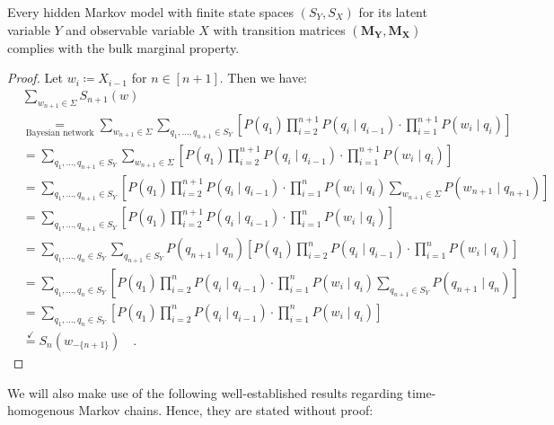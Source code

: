 \documentclass[../../main.tex]{subfiles}
\begin{document}
    \begin{lemma}
        Every hidden Markov model with finite state spaces $(S_Y, S_X)$ for its latent variable $Y$ and observable variable $X$ with transition matrices $(\bm{M_Y}, \bm{M_X})$ complies with the bulk marginal property.
    \end{lemma}
    \vspace{-2.5em}
    \begin{proof}
        Let $w_i \coloneqq X_{i - 1}$ for $n \in [n + 1]$. Then we have:
        \begin{align*}
            &\sum_{w_{n + 1} \in \Sigma} S_{n + 1}(w) \\
            &\underset{\text{Bayesian network}}{=} \sum_{w_{n + 1} \in \Sigma} \sum_{q_1, \dots, q_{n+1} \in S_Y} \left[ P(q_1) \prod_{i=2}^{n+1} P(q_i \mid q_{i-1}) \cdot \prod_{i=1}^{n+1} P(w_i \mid q_i) \right] \\
            &= \sum_{q_1, \dots, q_{n+1} \in S_Y} \sum_{w_{n + 1} \in \Sigma}  \left[ P(q_1) \prod_{i=2}^{n+1} P(q_i \mid q_{i-1}) \cdot \prod_{i=1}^{n+1} P(w_i \mid q_i) \right] \\
            &= \sum_{q_1, \dots, q_{n+1} \in S_Y} \left[ P(q_1) \prod_{i=2}^{n+1} P(q_i \mid q_{i-1}) \cdot \prod_{i=1}^{n} P(w_i \mid q_i) \sum_{w_{n + 1} \in \Sigma}  P(w_{n+1} \mid q_{n+1}) \right] \\
            &= \sum_{q_1, \dots, q_{n+1} \in S_Y} \left[ P(q_1) \prod_{i=2}^{n+1} P(q_i \mid q_{i-1}) \cdot \prod_{i=1}^{n} P(w_i \mid q_i) \right] \\
            &= \sum_{q_1, \dots, q_{n} \in S_Y} \sum_{q_{n+1} \in S_Y} P(q_{n+1} \mid q_n) \left[ P(q_1) \prod_{i=2}^{n} P(q_i \mid q_{i-1}) \cdot \prod_{i=1}^{n} P(w_i \mid q_i) \right] \\
            &= \sum_{q_1, \dots, q_{n} \in S_Y} \left[ P(q_1) \prod_{i=2}^{n} P(q_i \mid q_{i-1}) \cdot \prod_{i=1}^{n} P(w_i \mid q_i) \sum_{q_{n+1} \in S_Y} P(q_{n+1} \mid q_n) \right] \\
            &= \sum_{q_1, \dots, q_{n} \in S_Y} \left[ P(q_1) \prod_{i=2}^{n} P(q_i \mid q_{i-1}) \cdot \prod_{i=1}^{n} P(w_i \mid q_i) \right] \\
            &\overset{\checkmark}{=} S_n(w_{-\{n+1\}}) \quad .
        \end{align*}
    \end{proof}

    We will also make use of the following well-established results regarding time-homogenous Markov chains. Hence, they are stated without proof:
\end{document}
